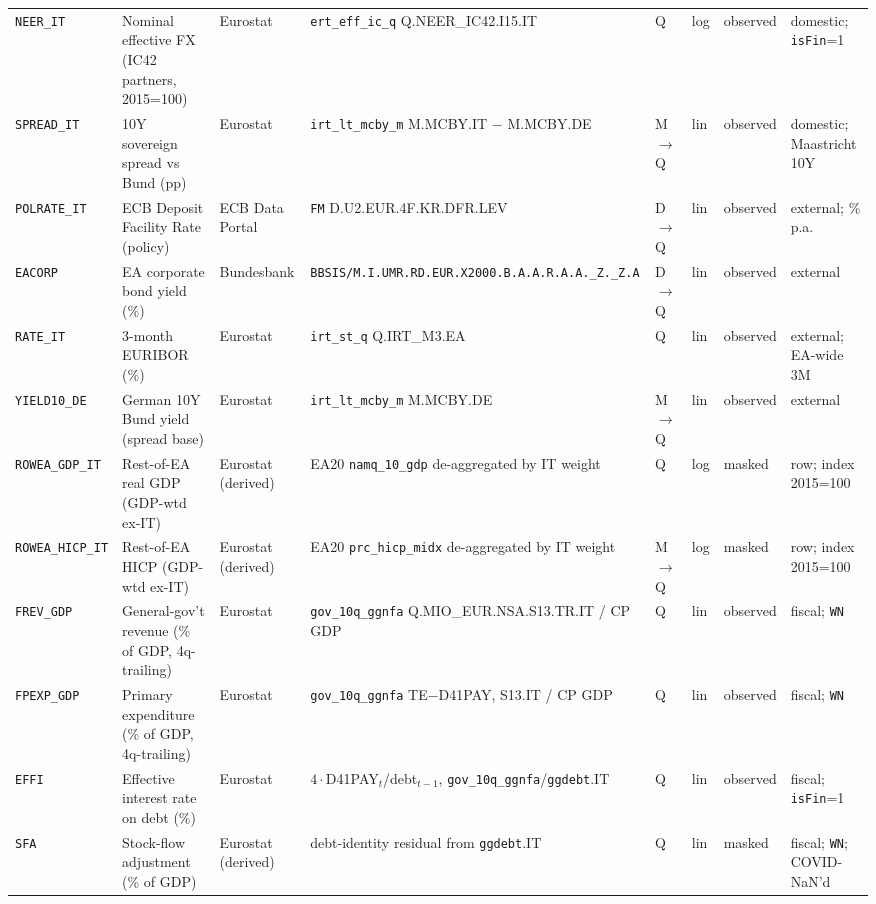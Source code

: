 \begin{longtable}{@{}p{}p{}p{}p{}p{}p{}p{}p{}@{}}
\texttt{NEER\_IT}  & Nominal effective FX (IC42 partners, 2015=100) & Eurostat & \texttt{ert\_eff\_ic\_q} Q.NEER\_IC42.I15.IT & Q & log & observed & domestic; \texttt{isFin}=1 \\
\texttt{SPREAD\_IT}& 10Y sovereign spread vs Bund (pp) & Eurostat & \texttt{irt\_lt\_mcby\_m} M.MCBY.IT $-$ M.MCBY.DE & M$\to$Q & lin & observed & domestic; Maastricht 10Y \\
\texttt{POLRATE\_IT}& ECB Deposit Facility Rate (policy) & ECB Data Portal & \texttt{FM} D.\allowbreak U2.\allowbreak EUR.\allowbreak 4F.\allowbreak KR.\allowbreak DFR.\allowbreak LEV & D$\to$Q & lin & observed & external; \% p.a. \\
\texttt{EACORP}    & EA corporate bond yield (\%) & Bundesbank & \texttt{BBSIS/\allowbreak M.\allowbreak I.\allowbreak UMR.\allowbreak RD.\allowbreak EUR.\allowbreak X2000.\allowbreak B.A.A.\allowbreak R.A.A.\allowbreak \_Z.\_Z.A} & D$\to$Q & lin & observed & external \\
\texttt{RATE\_IT}  & 3-month EURIBOR (\%) & Eurostat & \texttt{irt\_st\_q} Q.IRT\_M3.EA & Q & lin & observed & external; EA-wide 3M \\
\texttt{YIELD10\_DE}& German 10Y Bund yield (spread base) & Eurostat & \texttt{irt\_lt\_mcby\_m} M.MCBY.DE & M$\to$Q & lin & observed & external \\
\texttt{ROWEA\_GDP\_IT}  & Rest-of-EA real GDP (GDP-wtd ex-IT) & Eurostat (derived) & EA20 \texttt{namq\_10\_gdp} de-aggregated by IT weight & Q & log & masked & row; index 2015=100 \\
\texttt{ROWEA\_HICP\_IT} & Rest-of-EA HICP (GDP-wtd ex-IT) & Eurostat (derived) & EA20 \texttt{prc\_hicp\_midx} de-aggregated by IT weight & M$\to$Q & log & masked & row; index 2015=100 \\
\texttt{FREV\_GDP} & General-gov't revenue (\% of GDP, 4q-trailing) & Eurostat & \texttt{gov\_10q\_ggnfa} Q.\allowbreak MIO\_EUR.\allowbreak NSA.\allowbreak S13.\allowbreak TR.\allowbreak IT / CP GDP & Q & lin & observed & fiscal; \texttt{WN} \\
\texttt{FPEXP\_GDP}& Primary expenditure (\% of GDP, 4q-trailing) & Eurostat & \texttt{gov\_10q\_ggnfa} TE$-$D41PAY, S13.IT / CP GDP & Q & lin & observed & fiscal; \texttt{WN} \\
\texttt{EFFI}      & Effective interest rate on debt (\%) & Eurostat & $4\cdot$D41PAY$_t$/debt$_{t-1}$, \texttt{gov\_10q\_ggnfa}/\texttt{ggdebt}.IT & Q & lin & observed & fiscal; \texttt{isFin}=1 \\
\texttt{SFA}       & Stock-flow adjustment (\% of GDP) & Eurostat (derived) & debt-identity residual from \texttt{ggdebt}.IT & Q & lin & masked & fiscal; \texttt{WN}; COVID-NaN'd \\

\end{longtable}
